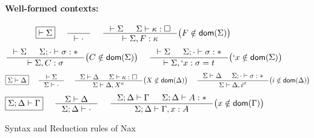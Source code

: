 \begin{figure}
\begin{framed}
\paragraph{Well-formed contexts:}
\[ \fbox{$|- \Sigma$}
 ~~~~
   \inference{}{|- \cdot}
 ~~~~
   \inference{|- \Sigma & \Sigma |- \kappa:\square}
             {|- \Sigma,F:\kappa}
      \big( F\notin\dom(\Sigma) \big)
\]
\[ \inference{|- \Sigma & \Sigma;\cdot |- \sigma:*}
             {|- \Sigma,C:\sigma}
      \big( C\notin\dom(\Sigma) \big)
 ~~~~
   \inference{|- \Sigma & \Sigma;\cdot |- \sigma:*}
             {|- \Sigma,`x:\sigma=t}
      \big( `x\notin\dom(\Sigma) \big)
\]
\[ \fbox{$\Sigma|- \Delta$}
 ~~~~
   \inference{|- \Sigma}{\Sigma |- \cdot}
 ~~~~
   \inference{\Sigma |- \Delta & \Sigma |- \kappa:\square}
             {\Sigma |- \Delta,X^\kappa}
      \big( X\notin\dom(\Delta) \big)
 ~~~~ 
   \inference{\Sigma |- \Delta & \Sigma;\cdot |- \sigma:*}
             {\Sigma |- \Delta,i^\sigma}
      \big( i\notin\dom(\Delta) \big)
\]
\[ \fbox{$\Sigma;\Delta |- \Gamma$}
 ~~~~
   \inference{\Sigma |- \Delta}{\Sigma;\Delta |- \cdot}
 ~~~~
   \inference{\Sigma;\Delta |- \Gamma & \Sigma;\Delta |- A:*}
             {\Sigma;\Delta |- \Gamma,x:A}
      \big( x\notin\dom(\Gamma) \big)
\]
\end{framed}
\caption{Syntax and Reduction rules of Nax}
\label{fig:NaxSyntax}
\end{figure}

